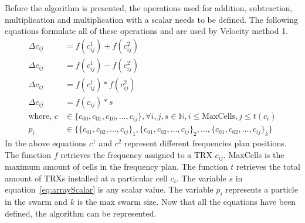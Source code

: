 Before the algorithm is presented, the operations used for addition, subtraction, multiplication and multiplication with a scalar needs to be defined. The following equations formulate all of these operations and are used by Velocity method 1.
\begin{align}
    \Delta c_{ij} &= f(c^1_{ij}) + f(c^2_{ij})\label{eq:arrayAdd}\\
    \Delta c_{ij} &= f(c^1_{ij}) - f(c^2_{ij})\label{eq:arraySubtract}\\
	\Delta c_{ij} &= f(c^1_{ij}) * f(c^2_{ij})\label{eq:arrayMultiply}\\
    \Delta c_{ij} &= f(c_{ij}) * s \label{eq:arrayScalar}\\
    \text{where, }c &\in \{c_{00},c_{01},c_{10}, \dots, c_{ij}\} , \forall i,j,s \in \mathbb{N}, i \leq \text{MaxCells}, j \leq t(c_i)\nonumber\\ 
    p_i &\in \{\{c_{01},c_{02},\dots,c_{ij}\}_1,\{c_{01},c_{02},\dots,c_{ij}\}_2, \dots,\{c_{01},c_{02},\dots,c_{ij}\}_k\}\nonumber
\end{align}
In the above equations $c^1$ and $c^2$ represent different frequencies plan positions. The function $f$ retrieves the frequency assigned to a TRX $c_{ij}$. MaxCells is the maximum amount of cells in the frequency plan. The function $t$ retrieves the total amount of TRXs installed at a particular cell $c_i$. The variable $s$ in equation~\ref{eq:arrayScalar} is any scalar value. The variable $p_i$ represents a particle in the swarm and $k$ is the max swarm size. Now that all the equations have been defined, the algorithm can be represented. 

